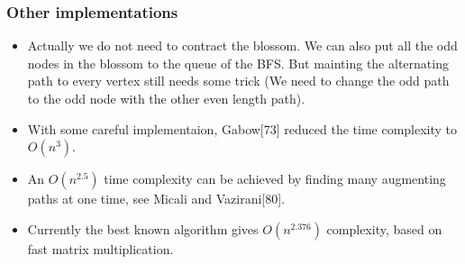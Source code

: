 \documentclass[hyperref={pdfpagelabels=false}]{beamer}
\begin{document}
\frame
{
	\frametitle{Other implementations}
	
	\begin{itemize}
		\item<1-> Actually we do not need to contract the blossom. We can also put all the odd nodes in the blossom to the queue of the BFS. But mainting the alternating path to every vertex still needs some trick (We need to change the odd path to the odd node with the other even length path).
		\item<2-> With some careful implementaion, Gabow[73] reduced the time complexity to $O(n^{3})$.
		\item<3-> An $O(n^{2.5})$ time complexity can be achieved by finding many augmenting paths at one time, see Micali and Vazirani[80].
		\item<4-> Currently the best known algorithm gives $O(n^{2.376})$ complexity, based on fast matrix multiplication.
	\end{itemize}
	
}

%			
%
%			
%
\end{document}

